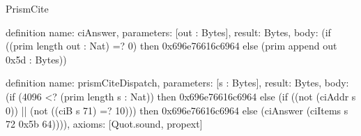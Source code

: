 \begin{lexlean}{PrismCite}
\begin{semanticmodule}
definition{
  name: ciAnswer,
  parameters: [out : Bytes],
  result: Bytes,
  body: (if ((prim length out : Nat) =? 0) then 0x696e76616c6964 else (prim append out 0x5d : Bytes))
}

definition{
  name: prismCiteDispatch,
  parameters: [s : Bytes],
  result: Bytes,
  body: (if (4096 <? (prim length s : Nat)) then 0x696e76616c6964 else (if ((not (ciAddr s 0)) || (not ((ciB s 71) =? 10))) then 0x696e76616c6964 else (ciAnswer (ciItems s 72 0x5b 64)))),
  axioms: [Quot.sound, propext]
}

\end{semanticmodule}
\end{lexlean}
